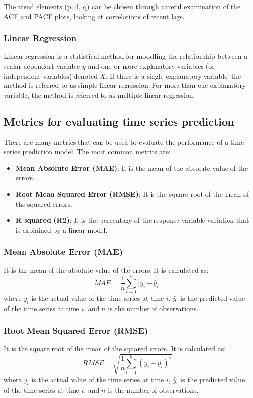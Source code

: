 \documentclass[manuscript,screen,nonacm,11pt]{acmart}
\numberwithin{equation}{section}
\begin{document}
The trend elements (p, d, q) can be chosen through careful examination 
of the ACF and PACF plots, looking at correlations of recent lags.

\subsubsection{Linear Regression}
Linear regression is a statistical method for modelling the relationship between a scalar dependent variable $y$ and one or more explanatory variables (or independent variables) denoted $X$.
If there is a single explanatory variable, the method is referred to as simple linear regression. For more than one explanatory variable, the method is referred to as multiple linear regression.

\subsection{Metrics for evaluating time series prediction}
\label{sec:metrics}
There are many metrics that can be used to evaluate the performance of a time series prediction model. The most common metrics are:
\begin{itemize}
\item \textbf{Mean Absolute Error (MAE)}: It is the mean of the absolute value of the errors. 
\item \textbf{Root Mean Squared Error (RMSE)}: It is the square root of the mean of the squared errors. 
\item \textbf{R squared (R2)}: It is the percentage of the response variable variation that is explained by a linear model. 
\end{itemize}

\subsubsection{Mean Absolute Error (MAE)}
It is the mean of the absolute value of the errors. It is calculated as:
\begin{equation}
\label{eq:mae}
MAE = \frac{1}{n}\sum_{i=1}^{n} |y_i - \hat{y}_i|
\end{equation}
where $y_i$ is the actual value of the time series at time $i$, $\hat{y}_i$ is the predicted value of the time series at time $i$, and $n$ is the number of observations.

\subsubsection{Root Mean Squared Error (RMSE)}
It is the square root of the mean of the squared errors. It is calculated as:
\begin{equation}
\label{eq:rmse}
RMSE = \sqrt{\frac{1}{n}\sum_{i=1}^{n} (y_i - \hat{y}_i)^2}
\end{equation}
where $y_i$ is the actual value of the time series at time $i$, $\hat{y}_i$ is the predicted value of the time series at time $i$, and $n$ is the number of observations.
\end{document}

